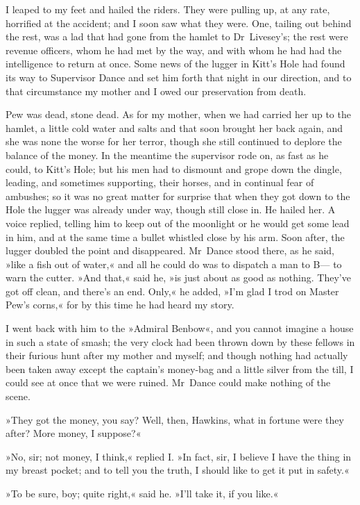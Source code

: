 I leaped to my feet and hailed the riders. They were pulling up, at any rate, horrified at the accident; and I soon saw what they were. One, tailing out behind the rest, was a lad that had gone from the hamlet to Dr~Livesey's; the rest were revenue officers, whom he had met by the way, and with whom he had had the intelligence to return at once. Some news of the lugger in Kitt's Hole had found its way to Supervisor Dance and set him forth that night in our direction, and to that circumstance my mother and I owed our preservation from death.

Pew was dead, stone dead. As for my mother, when we had carried her up to the hamlet, a little cold water and salts and that soon brought her back again, and she was none the worse for her terror, though she still continued to deplore the balance of the money. In the meantime the supervisor rode on, as fast as he could, to Kitt's Hole; but his men had to dismount and grope down the dingle, leading, and sometimes supporting, their horses, and in continual fear of ambushes; so it was no great matter for surprise that when they got down to the Hole the lugger was already under way, though still close in. He hailed her. A voice replied, telling him to keep out of the moonlight or he would get some lead in him, and at the same time a bullet whistled close by his arm. Soon after, the lugger doubled the point and disappeared. Mr~Dance stood there, as he said, »like a fish out of water,« and all he could do was to dispatch a man to B— to warn the cutter. »And that,« said he, »is just about as good as nothing. They've got off clean, and there's an end. Only,« he added, »I'm glad I trod on Master Pew's corns,« for by this time he had heard my story.

I went back with him to the »Admiral Benbow«, and you cannot imagine a house in such a state of smash; the very clock had been thrown down by these fellows in their furious hunt after my mother and myself; and though nothing had actually been taken away except the captain's money-bag and a little silver from the till, I could see at once that we were ruined. Mr~Dance could make nothing of the scene.

»They got the money, you say? Well, then, Hawkins, what in fortune were they after? More money, I suppose?«

»No, sir; not money, I think,« replied I. »In fact, sir, I believe I have the thing in my breast pocket; and to tell you the truth, I should like to get it put in safety.«

»To be sure, boy; quite right,« said he. »I'll take it, if you like.«

